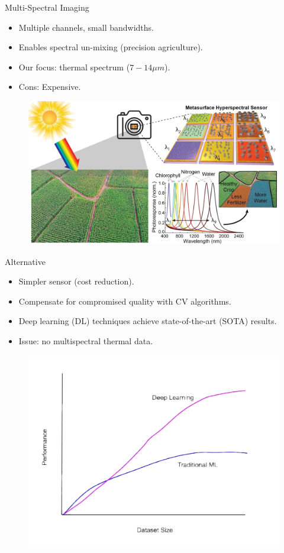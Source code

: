 
\begin{frame}{Multi-Spectral Imaging}
  \begin{itemize}
    \item Multiple channels, small bandwidths.
    \item Enables spectral un-mixing (precision agriculture).
    \item Our focus: thermal spectrum ($7-14 \mu m$). 
    \item Cons: Expensive.
  \end{itemize}

  \begin{figure}
    \centering
    \includegraphics[width=0.6\linewidth]{../figs/introduction/multispectral.png}
  \end{figure}  
\end{frame}

\begin{frame}{Alternative}
    \begin{itemize}
      \item Simpler sensor (cost reduction).
      \item Compensate for compromised quality with CV algorithms.
      \item Deep learning (DL) techniques achieve state-of-the-art (SOTA) results.
      \item Issue: no multispectral thermal data.
    \end{itemize}
  
    \begin{figure}
      \centering
      \includegraphics[width=0.5\linewidth]{../figs/introduction/dl_data_requirement.png}
    \end{figure}
  \end{frame}

